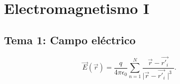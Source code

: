 \chapter{Electromagnetismo I}
\section{Tema 1: Campo eléctrico}
\[
	\vec{E}\left( \vec{r} \right) =\frac{q}{4\pi \epsilon_0}\sum_{n=1}^{N} \frac{\vec{r}-\vec{r'_i}}{ \mid \vec{r}-\vec{r'_i} \mid ^3}
.\] 
